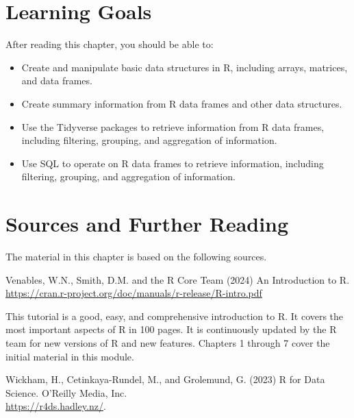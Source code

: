 %
%
\section*{Learning Goals}

After reading this chapter, you should be able to:
\begin{itemize}
   \item Create and manipulate basic data structures in R, including arrays, matrices, and data frames.
   \item Create summary information from R data frames and other data structures.
   \item Use the Tidyverse packages to retrieve information from R data frames, including filtering, grouping, and aggregation of information.
   \item Use SQL to operate on R data frames to retrieve information, including filtering, grouping, and aggregation of information.
\end{itemize}


\section*{Sources and Further Reading}

The material in this chapter is based on the following sources. 

\begin{tcolorbox}[colback=alert]
Venables, W.N., Smith, D.M. and the R Core Team (2024) An Introduction to R.  \\

\url{https://cran.r-project.org/doc/manuals/r-release/R-intro.pdf}
\end{tcolorbox}

This tutorial is a good, easy, and comprehensive introduction to R. It covers the most important aspects of R in 100 pages. It is continuously updated by the R team for new versions of R and new features. Chapters 1 through 7 cover the initial material in this module. 

\begin{tcolorbox}[colback=alert]
Wickham, H., Cetinkaya-Rundel, M., and Grolemund, G. (2023) R for Data Science. O'Reilly Media, Inc. \\

\url{https://r4ds.hadley.nz/}. 
\end{tcolorbox}

